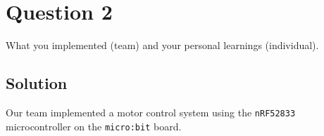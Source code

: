 \section*{Question 2}

What you implemented (team) and your personal learnings (individual).

\subsection*{Solution}

Our team implemented a motor control system using the \texttt{nRF52833} microcontroller on the \texttt{micro:bit} board.
